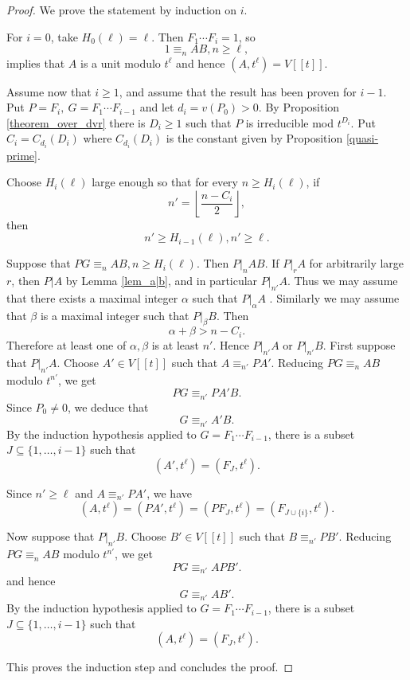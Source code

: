 \documentclass[10pt,a4paper]{amsart}
\begin{document}
\begin{proof}
We prove the statement by induction on $i$.

For $i=0$, take $H_0(\ell)=\ell$. Then $F_1\cdots F_i=1$, so 
$$
1\equiv_n AB, n\ge \ell,
$$
implies that $A$ is a unit modulo $t^\ell$ and hence
$(A,t^\ell)=V[[t]]$. 


Assume now that $i\ge 1$, and assume that the result has been proven for $i-1$. Put
$P=F_i,\ G=F_1\cdots F_{i-1}$ and let 
$
d_i=v(P_0)>0.
$
By Proposition \ref{theorem_over_dvr} there is $D_i\ge 1$ such that $P$ is irreducible mod $t^{D_i}$. Put $C_i=C_{d_i}(D_i)$
where $C_{d_i}(D_i)$ is the constant given by Proposition \ref{quasi-prime}. 

Choose $H_i(\ell)$ large enough so that for every $n\ge H_i(\ell)$, if
$$
n'=\left\lfloor \frac{n-C_i}{2}\right\rfloor,
$$
then
$$
n'\geq H_{i-1}(\ell),
n'\geq \ell.
$$


Suppose that $PG\equiv_n AB, n\ge H_i(\ell)$. 
Then $P|_n AB$. If $P|_r A$ for arbitrarily large $r$, then $P|A$ by Lemma \ref{lem_a|b}, and in particular $P|_{n'} A$. Thus we may assume that there exists a maximal integer $\alpha$ such that $P |_\alpha A$ . Similarly we may assume that $\beta$ is a maximal integer such that $P|_\beta B$. Then $$
\alpha+\beta>n-C_i.
$$
Therefore at least one of $\alpha,\beta$ is at least $n'$. Hence
$P |_{n'} A$ or $P|_{n'} B.$ First suppose that $P|_{n'}A$. Choose $A'\in V[[t]]$ such that $A \equiv_{n'} PA'$. Reducing $PG\equiv_n AB$ modulo $t^{n'}$, we get
$$
PG\equiv_{n'} PA'B.
$$
Since $P_0\neq 0$, we deduce that
$$
G\equiv_{n'} A'B.
$$
By the induction hypothesis applied to $G=F_1\cdots F_{i-1}$, there is a subset $J\subseteq \{1,\ldots,i-1\}$ such that
$$
(A',t^\ell)=(F_J,t^\ell).
$$

Since $n'\ge \ell$ and $A\equiv_{n'}PA'$, we have
$$
(A,t^\ell) =(PA',t^\ell) =
(PF_J,t^\ell) = (F_{J\cup\{i\}},t^\ell).
$$

Now suppose that $P|_{n'}B$. Choose $B'\in V[[t]]$ such that
$B\equiv_{n'}PB'$. Reducing $PG\equiv_n AB$ modulo $t^{n'}$, we get
$$
PG\equiv_{n'} APB'.
$$
and hence
$$
G\equiv_{n'} AB'.
$$
By the induction hypothesis applied to $G=F_1\cdots F_{i-1}$, there is a subset $J\subseteq \{1,\ldots,i-1\}$ such that
$$
(A,t^\ell)=(F_J,t^\ell).
$$

This proves the induction step and concludes the proof.
\end{proof}
\end{document}
